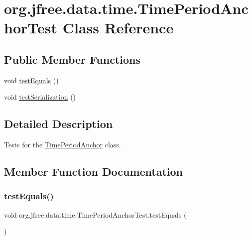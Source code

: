 \hypertarget{classorg_1_1jfree_1_1data_1_1time_1_1_time_period_anchor_test}{}\section{org.\+jfree.\+data.\+time.\+Time\+Period\+Anchor\+Test Class Reference}
\label{classorg_1_1jfree_1_1data_1_1time_1_1_time_period_anchor_test}
\subsection*{Public Member Functions}
\begin{DoxyCompactItemize}
\item 
void \mbox{\hyperlink{classorg_1_1jfree_1_1data_1_1time_1_1_time_period_anchor_test_add61e510e7e284be7298439ae8ba08d1}{test\+Equals}} ()
\item 
void \mbox{\hyperlink{classorg_1_1jfree_1_1data_1_1time_1_1_time_period_anchor_test_a9fd367ea7966be4dcb5e317df32f1bef}{test\+Serialization}} ()
\end{DoxyCompactItemize}


\subsection{Detailed Description}
Tests for the \mbox{\hyperlink{classorg_1_1jfree_1_1data_1_1time_1_1_time_period_anchor}{Time\+Period\+Anchor}} class. 

\subsection{Member Function Documentation}
\mbox{\label{classorg_1_1jfree_1_1data_1_1time_1_1_time_period_anchor_test_add61e510e7e284be7298439ae8ba08d1}} 
\subsubsection{\texorpdfstring{test\+Equals()}{testEquals()}}
{\footnotesize\ttfamily void org.\+jfree.\+data.\+time.\+Time\+Period\+Anchor\+Test.\+test\+Equals (\begin{DoxyParamCaption}{ }\end{DoxyParamCaption})}

